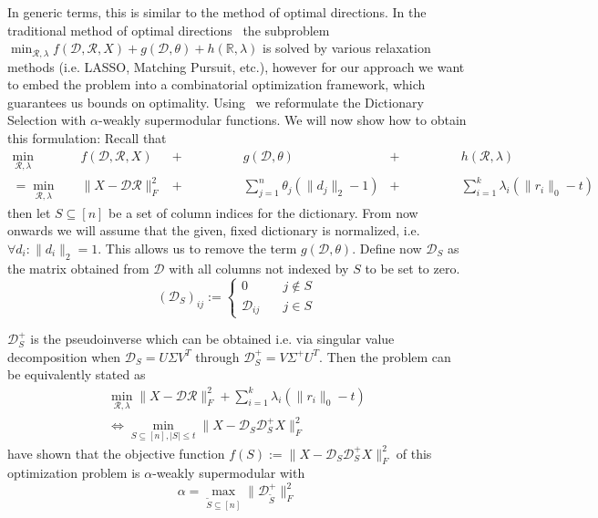 \documentclass{article}
\newcommand{\R}{\mathbb{R}}
\newcommand{\Rr}{\mathcal{R}}
\newcommand{\D}{\mathcal{D}}
\begin{document}
\noindent In generic terms, this is similar to the method of optimal directions. In the traditional method of optimal directions~\cite{MOD} the subproblem $\min_{\Rr, \lambda} f(\D, \Rr, X) + g(\D, \theta) + h(\R, \lambda)$ is solved by various relaxation methods (i.e. LASSO, Matching Pursuit, etc.), however for our approach we want to embed the problem into a combinatorial optimization framework, which guarantees us bounds on optimality. Using~\cite{weaklyalpha} we reformulate the Dictionary Selection with $\alpha$-weakly supermodular functions. We will now show how to obtain this formulation:
Recall that
\begin{align*}
\min_{\Rr, \lambda}\quad &f(\D, \Rr, X) &+& \qquad\qquad g(\D, \theta) &+& \qquad\qquad h(\Rr, \lambda) \\
= \min_{\Rr, \lambda}\quad &\|X -\D \Rr\|_F^2 &+& \qquad\qquad\sum_{j=1}^n \theta_j (\| d_j\|_2 - 1) &+& \qquad\qquad\sum_{i=1}^k \lambda_i (\| r_i \|_0 - t)
\end{align*}
then let $S \subseteq [n]$ be a set of column indices for the dictionary. From now onwards we will assume that the given, fixed dictionary is normalized, i.e. $\forall d_i: \|d_i \|_2 = 1$. This allows us to remove the term $g(\D, \theta)$. Define now $\D_S$ as the matrix obtained from $\D$ with all columns not indexed by $S$ to be set to zero.
\[
(\D_S)_{ij} := \begin{cases}
0 \quad &j \notin S \\
\D_{ij} \quad &j\in S
\end{cases}
\]

\noindent$\D_S^+$ is the pseudoinverse which can be obtained i.e. via singular value decomposition when $\D_S = U\Sigma V^T$ through $\D_S^+ = V \Sigma^+ U^T$.
Then the problem can be equivalently stated as
\[
\begin{split}
 \min_{\Rr, \lambda} \|X  -\D \Rr\|_F^2 + \sum_{i=1}^k \lambda_i (\| r_i \|_0 - t)\\
 \Longleftrightarrow 
  \min_{S \subseteq [n], |S| \leq t} \|X  -\D_S\D_S^+ X\|_F^2
 \end{split}
\]
\cite{weaklyalpha} have shown that the objective function $f(S) := \|X  -\D_S\D_S^+ X\|_F^2$ of this optimization problem is $\alpha$-weakly supermodular with 
\[ 
\alpha = \max_{\tilde{S} \subseteq [n]}\| \D_{\tilde{S}}^+ \|_F^2
\]
\end{document}

